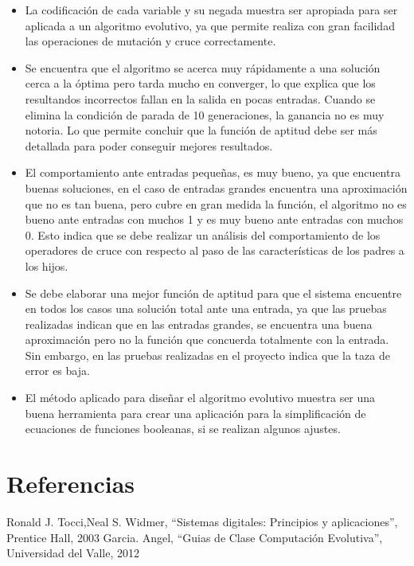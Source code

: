 \documentclass[letter]{article}
\begin{document}
\begin{itemize}
	\item La codificación de cada variable y su negada muestra ser apropiada para ser aplicada a un algoritmo evolutivo, ya que permite realiza con gran facilidad las operaciones de mutación y cruce correctamente.
	\item Se encuentra que el algoritmo se acerca muy rápidamente a una solución cerca a la óptima pero tarda mucho en converger, lo que explica que los resultandos incorrectos fallan en la salida en pocas entradas. Cuando se elimina la condición de parada de 10 generaciones, la ganancia no es muy notoria. Lo que permite concluir que la función de aptitud debe ser más detallada para poder conseguir mejores resultados.
	\item El comportamiento ante entradas pequeñas, es muy bueno, ya que encuentra buenas soluciones, en el caso de entradas grandes encuentra una aproximación que no es tan buena, pero cubre en gran medida la función, el algoritmo no es bueno ante entradas con muchos 1 y es muy bueno ante entradas con muchos 0. Esto indica que se debe realizar un análisis del comportamiento de los operadores de cruce con respecto al paso de las características de los padres a los hijos.
	\item Se debe elaborar una mejor función de aptitud para que el sistema encuentre en todos los casos una solución total ante una entrada, ya que las pruebas realizadas indican que en las entradas grandes, se encuentra una buena aproximación pero no la función que concuerda totalmente con la entrada. Sin embargo, en las pruebas realizadas en el proyecto indica que la taza de error es baja.
	\item El método aplicado para diseñar el algoritmo evolutivo muestra ser una buena herramienta para crear una aplicación para la simplificación de ecuaciones de funciones booleanas, si se realizan algunos ajustes.
\end{itemize}

\section{Referencias}

\begin{thebibliography}{9}
  Ronald J. Tocci,Neal S. Widmer, ``Sistemas digitales: Principios y aplicaciones'', Prentice Hall, 2003
  Garcia. Angel, ``Guias de Clase Computación Evolutiva'', Universidad del Valle, 2012  
\end{thebibliography}
\end{document}
